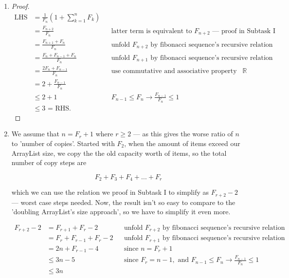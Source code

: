 \documentclass{article}
\theoremstyle{remark}
\begin{document}
\begin{enumerate}
\begin{proof}
        \qedhere
        \end{proof}

      \item[(II)]
        \begin{proof}
        \begin{align*}
            \text{LHS}
            &= \frac{1}{F_n}\!\left(1 + \sum_{k=1}^n F_k\right) \\
            &= \frac{F_{n+2}}{F_n} 
            && \text{latter term is equivalent to } F_{n+2} \text{ --- proof in Subtask I} \\
            &= \frac{F_{n+1} + F_{n}}{F_n} 
            && \text{unfold $F_{n+2}$ by fibonacci sequence's recursive relation} \\
            &= \frac{F_n + F_{n-1} + F_n}{F_n}
            && \text{unfold $F_{n+1}$ by fibonacci sequence's recursive relation} \\
            &= \frac{2F_n + F_{n-1}}{F_n}
            && \text{use commutative and associative property of $\mathbb{R}$} \\
            &= 2 + \frac{F_{n-1}}{F_n} \\
            &\le 2 + 1 
            &&  F_{n-1} \le F_n \rightarrow \frac{F_{n-1}}{F_n} \le 1\\
            &\le 3 \text{ = RHS.}
        \end{align*}
        \qedhere
        \end{proof}

    \newpage

    \item[(III)] We assume that $n = F_r + 1$ where $r \geq 2$ --- as this gives the worse ratio of $n$ to 'number of copies'. Started with $F_2$, when the amount of items exceed our ArrayList size, we copy the the old capacity worth of items, so the total number of copy steps are

        \[F_2 + F_3 + F_4 + ... + F_{r}\]

        which we can use the relation we proof in Subtask I to simplify as $F_{r+2} - 2$ --- worst case steps needed. Now, the result isn't so easy to compare to the 'doubling ArrayList's size approach', so we have to simplify it even more. 

        \begin{align*}
            F_{r+2} - 2 &= F_{r+1} + F_r - 2
                && \text{unfold $F_{r+2}$ by fibonacci sequence's recursive relation} \\
                &= F_r + F_{r-1} + F_r - 2
                && \text{unfold $F_{r+1}$ by fibonacci sequence's recursive relation} \\
                &= 2n + F_{r-1} - 4
                && \text{since } n = F_r + 1 \\
                & \le 3n - 5
                &&  \text{since } F_r = n - 1, \text{ and } F_{n-1} \le F_n \rightarrow \frac{F_{n-1}}{F_n} \le 1\\
                & \le 3n
        \end{align*}


\end{enumerate}
\end{document}
